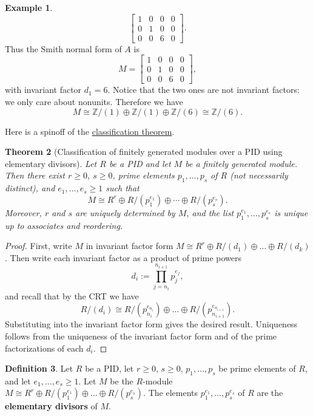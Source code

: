 \documentclass[12pt]{report}
\newtheorem{theorem}{Theorem}[chapter]
\numberwithin{equation}{section}
\numberwithin{theorem}{chapter}
\theoremstyle{definition}
\newtheorem{definition}[theorem]{Definition}
\newtheorem{example}[theorem]{Example}
\newtheorem*{basic properties}{Basic Properties}
\newtheorem*{Important Remark}{Important Remark}
\newcommand{\df}[1]{{\bf #1}\index{#1}}
\begin{document}
\begin{example}
$$\begin{bmatrix}
1 & 0 & 0  & 0 \\
0 & 1 & 0 & 0\\
0 & 0 & 6 & 0
\end{bmatrix}
.$$
Thus the Smith normal form of $A$ is 
$$M=\begin{bmatrix}
1 & 0 & 0 & 0 \\
0 & 1 & 0 & 0 \\
0 & 0 & 6 & 0
\end{bmatrix},$$
with invariant factor $d_1=6$. Notice that the two ones are not invariant factors: we only care about nonunits. Therefore we have 
$$M\cong \mathbb{Z}/(1)\oplus \mathbb{Z}/(1)\oplus \mathbb{Z}/(6)\cong \mathbb{Z}/(6).$$
\end{example}


Here is a spinoff of the \hyperref[classification mods over pids]{classification theorem}.


\begin{theorem}[Classification of finitely generated modules over a PID using elementary divisors]\label{classification elementary divisors}
Let $R$ be a PID and let $M$ be a finitely generated module. Then there exist $r \geqslant 0$, $s \geqslant 0$, prime elements $p_1,\ldots,p_s$ of $R$ (not necessarily distinct), and $e_1,\ldots ,e_s \geqslant 1$ such that 
$$M \cong R^r \oplus R/(p_1^{e_1}) \oplus \cdots \oplus R/(p_s^{e_s}).$$
Moreover, $r$ and $s$ are uniquely determined by $M$, and the list $p_1^{e_1},\ldots, p_s^{e_s}$ is unique up to associates and reordering.
\end{theorem}
 
\begin{proof}
First, write $M$ in invariant factor form $M \cong R^r \oplus R/(d_1) \oplus \dots \oplus R/(d_k)$. Then write each invariant factor as a product of prime powers 
$$d_i := \prod_{j=n_i}^{n_{i+1}} p_j^{e_j},$$ 
and recall that by the CRT we have
$$R/(d_i)\cong R/(p_{n_i}^{e_{n_i}})\oplus\dots\oplus R/(p_{n_{i+1}}^{e_{n_{i+1}}}).$$ 
Substituting into the invariant factor form gives the desired result. Uniqueness follows from the uniqueness of the invariant factor form and of the prime factorizations of each $d_i$.
 \end{proof}



\begin{definition} 
Let $R$ be a PID, let $r \geqslant 0$, $s \geqslant 0$, $p_1,\ldots,p_s$ be prime elements of $R$, and let $e_1,\ldots,e_s \geqslant 1$. Let $M$ be the $R$-module $M \cong R^r \oplus R/(p_1^{e_1}) \oplus \dots \oplus R/(p_s^{e_s})$. The elements $p_1^{e_1},\ldots, p_s^{e_s}$ of $R$ are the \df{elementary divisors} of $M$.
\end{definition}
\end{document}
